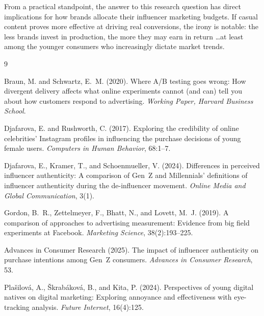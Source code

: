 \documentclass[10pt]{article}
\begin{document}
From a practical standpoint, the answer to this research question has direct implications for how brands allocate their influencer marketing budgets. If casual content proves more effective at driving real conversions, the irony is notable: the less brands invest in production, the more they may earn in return \dots at least among the younger consumers who increasingly dictate market trends.

\newpage
\begin{thebibliography}{9}

Braun, M. and Schwartz, E.~M. (2020).
\newblock Where A/B testing goes wrong: How divergent delivery affects what online experiments cannot (and can) tell you about how customers respond to advertising.
\newblock \textit{Working Paper, Harvard Business School}.

Djafarova, E. and Rushworth, C. (2017).
\newblock Exploring the credibility of online celebrities' Instagram profiles in influencing the purchase decisions of young female users.
\newblock \textit{Computers in Human Behavior}, 68:1--7.

Djafarova, E., Kramer, T., and Schoenmueller, V. (2024).
\newblock Differences in perceived influencer authenticity: A comparison of Gen~Z and Millennials' definitions of influencer authenticity during the de-influencer movement.
\newblock \textit{Online Media and Global Communication}, 3(1).

Gordon, B.~R., Zettelmeyer, F., Bhatt, N., and Lovett, M.~J. (2019).
\newblock A comparison of approaches to advertising measurement: Evidence from big field experiments at Facebook.
\newblock \textit{Marketing Science}, 38(2):193--225.

{Advances in Consumer Research} (2025).
\newblock The impact of influencer authenticity on purchase intentions among Gen~Z consumers.
\newblock \textit{Advances in Consumer Research}, 53.

Pla\v{s}ilov\'{a}, A., \v{S}krab\'{a}kov\'{a}, B., and Kita, P. (2024).
\newblock Perspectives of young digital natives on digital marketing: Exploring annoyance and effectiveness with eye-tracking analysis.
\newblock \textit{Future Internet}, 16(4):125.

\end{thebibliography}
\end{document}
